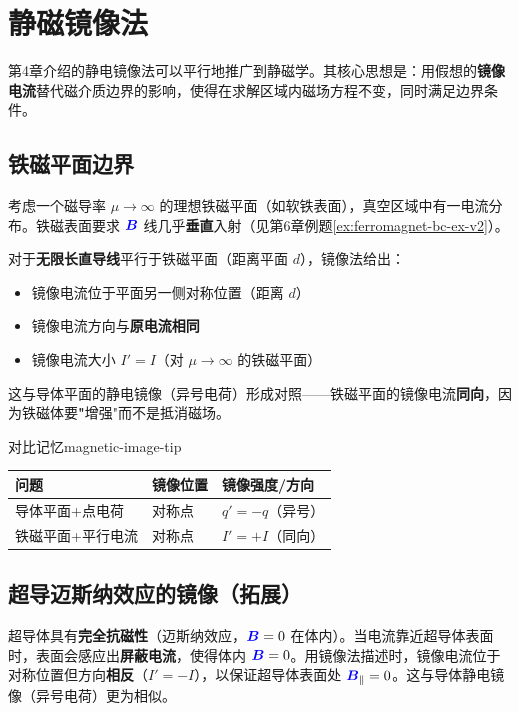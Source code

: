 \documentclass[11pt,a4paper,openany,oneside]{book}
\newcommand{\vecB}{\textcolor{blue}{\vect{B}}}
\newcommand{\vect}[1]{\bm{#1}}
\begin{document}
\section{静磁镜像法}

第4章介绍的静电镜像法可以平行地推广到静磁学。其核心思想是：用假想的\textbf{镜像电流}替代磁介质边界的影响，使得在求解区域内磁场方程不变，同时满足边界条件。

\subsection{铁磁平面边界}

考虑一个磁导率 $\mu \to \infty$ 的理想铁磁平面（如软铁表面），真空区域中有一电流分布。铁磁表面要求 $\vecB$ 线几乎\textbf{垂直}入射（见第6章例题\ref{ex:ferromagnet-bc-ex-v2}）。

对于\textbf{无限长直导线}平行于铁磁平面（距离平面 $d$），镜像法给出：
\begin{itemize}
\item 镜像电流位于平面另一侧对称位置（距离 $d$）
\item 镜像电流方向与\textbf{原电流相同}
\item 镜像电流大小 $I' = I$（对 $\mu \to \infty$ 的铁磁平面）
\end{itemize}

这与导体平面的静电镜像（异号电荷）形成对照——铁磁平面的镜像电流\textbf{同向}，因为铁磁体要\textbf"增强"而不是抵消磁场。

\begin{tip}{对比记忆}{magnetic-image-tip}
\begin{center}
\begin{tabular}{@{}lll@{}}
\toprule
\textbf{问题} & \textbf{镜像位置} & \textbf{镜像强度/方向} \\
\midrule
导体平面+点电荷 & 对称点 & $q' = -q$（异号） \\
铁磁平面+平行电流 & 对称点 & $I' = +I$（同向） \\
\bottomrule
\end{tabular}
\end{center}
\end{tip}

\subsection*{超导迈斯纳效应的镜像（拓展）}

超导体具有\textbf{完全抗磁性}（迈斯纳效应，$\vecB = 0$ 在体内）。当电流靠近超导体表面时，表面会感应出\textbf{屏蔽电流}，使得体内 $\vecB = 0$。用镜像法描述时，镜像电流位于对称位置但方向\textbf{相反}（$I' = -I$），以保证超导体表面处 $\vecB_\parallel = 0$。这与导体静电镜像（异号电荷）更为相似。
\end{document}
